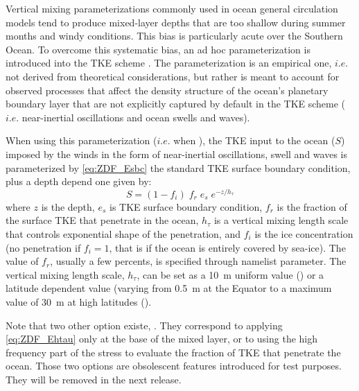 \documentclass[../tex_main/NEMO_manual]{subfiles}
\begin{document}
Vertical mixing parameterizations commonly used in ocean general circulation models 
tend to produce mixed-layer depths that are too shallow during summer months and windy conditions.
This bias is particularly acute over the Southern Ocean. 
To overcome this systematic bias, an ad hoc parameterization is introduced into the TKE scheme  \cite{Rodgers_2014}. 
The parameterization is an empirical one, $i.e.$ not derived from theoretical considerations, 
but rather is meant to account for observed processes that affect the density structure of 
the ocean’s planetary boundary layer that are not explicitly captured by default in the TKE scheme 
($i.e.$ near-inertial oscillations and ocean swells and waves).

When using this parameterization ($i.e.$ when ), the TKE input to the ocean ($S$) 
imposed by the winds in the form of near-inertial oscillations, swell and waves is parameterized 
by \autoref{eq:ZDF_Esbc} the standard TKE surface boundary condition, plus a depth depend one given by:
\begin{equation}  \label{eq:ZDF_Ehtau}
S = (1-f_i) \; f_r \; e_s \; e^{-z / h_\tau} 
\end{equation}
where 
$z$ is the depth,  
$e_s$ is TKE surface boundary condition, 
$f_r$ is the fraction of the surface TKE that penetrate in the ocean, 
$h_\tau$ is a vertical mixing length scale that controls exponential shape of the penetration, 
and $f_i$ is the ice concentration (no penetration if $f_i=1$, that is if the ocean is entirely 
covered by sea-ice).
The value of $f_r$, usually a few percents, is specified through  namelist parameter. 
The vertical mixing length scale, $h_\tau$, can be set as a 10~m uniform value () 
or a latitude dependent value (varying from 0.5~m at the Equator to a maximum value of 30~m 
at high latitudes (). 

Note that two other option existe, . They correspond to applying 
\autoref{eq:ZDF_Ehtau} only at the base of the mixed layer, or to using the high frequency part 
of the stress to evaluate the fraction of TKE that penetrate the ocean. 
Those two options are obsolescent features introduced for test purposes.
They will be removed in the next release. 



\end{document}
